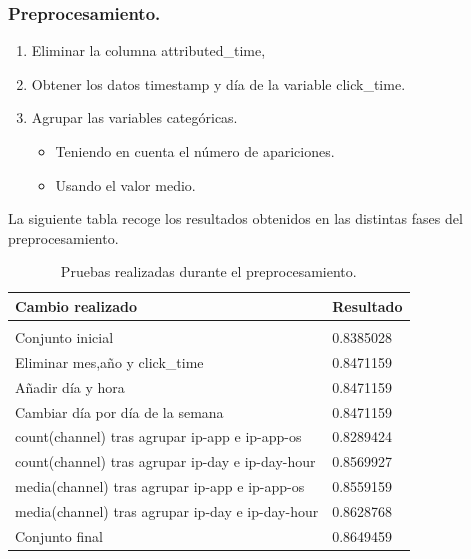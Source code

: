 \documentclass{beamer}
\theoremstyle{plain}
\theoremstyle{definition}
\theoremstyle{plain}
\theoremstyle{definition}
\theoremstyle{remark}
\theoremstyle{definition}
\begin{document}
\begin{frame}
	\frametitle{Preprocesamiento.}
	\begin{enumerate}
		\item Eliminar la columna attributed\_time,
			\item Obtener los datos timestamp y día de la variable click\_time.
		\item Agrupar las variables categóricas.
		\begin{itemize}
			\item Teniendo en cuenta el número de apariciones.
			\item Usando el valor medio.
		\end{itemize}
\end{enumerate}
\end{frame}

\begin{frame}
	La siguiente tabla recoge los resultados obtenidos en las distintas fases del preprocesamiento.
	\begin{table}[H]
		\centering
		
		\begin{tabular}{ll}
			\textbf{Cambio realizado}& \textbf{Resultado} \\
			\hline
			\\
			Conjunto inicial& 0.8385028     \\
			Eliminar mes,año y click\_time& 0.8471159  \\
			Añadir día y hora&  0.8471159 \\
			Cambiar día por día de la semana & 0.8471159\\
			count(channel) tras agrupar ip-app e ip-app-os & 0.8289424 \\
			count(channel) tras agrupar ip-day e ip-day-hour & 0.8569927 \\
			media(channel) tras agrupar ip-app e ip-app-os & 0.8559159 \\
			media(channel) tras agrupar ip-day e ip-day-hour & 0.8628768 \\
			Conjunto final & 0.8649459
		\end{tabular}
		\caption{Pruebas realizadas durante el preprocesamiento.}
	\end{table}
\end{frame}
\end{document}
